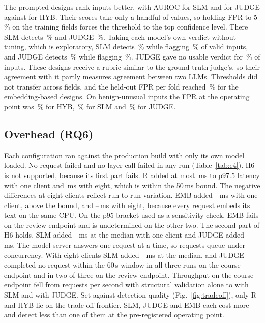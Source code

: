 \documentclass[conference]{IEEEtran}
\begin{document}
The prompted designs rank inputs better, with AUROC  for SLM and  for
JUDGE against  for HYB. Their scores take only a handful of values, so holding FPR to
5\,\% on the training fields forces the threshold to the top confidence level. There SLM detects
\,\% and JUDGE \,\%. Taking each model's own verdict without
tuning, which is exploratory, SLM detects \,\% while flagging \,\% of
valid inputs, and JUDGE detects \,\% while flagging \,\%. JUDGE
gave no usable verdict for \,\% of inputs. These designs receive a rubric similar
to the ground-truth judge's, so their agreement with it partly measures agreement between two LLMs.
Thresholds did not transfer across fields, and the held-out FPR per fold reached
\,\% for the embedding-based designs. On benign-unusual inputs the FPR at the
operating point was \,\% for HYB, \,\% for SLM and \,\%
for JUDGE.

\subsection{Overhead (RQ6)}

Each configuration ran against the production build with only its own model loaded. No request failed
and no layer call failed in any run (Table~\ref{tab:e4}). H6 is not supported, because its first part
fails. R added at most \,ms to p97.5 latency with one client and
\,ms with eight, which is within the 50\,ms bound. The negative differences at eight
clients reflect run-to-run variation. EMB added
--\,ms with one client, above the bound, and
--\,ms with eight, because every request embeds its text on the
same CPU. On the p95 bracket used as a sensitivity check, EMB fails on the review endpoint and is undetermined
on the other two. The second part of H6 holds. SLM added
--\,ms at the median with one client and JUDGE added
--\,ms. The model server answers one request at a
time, so requests queue under concurrency. With eight clients SLM added
--\,ms at the median, and JUDGE completed no request
within the 60\,s window in all three runs on the course endpoint and in two of three on the review
endpoint. Throughput on the course endpoint fell from  requests per
second with structural validation alone to  with SLM and
 with JUDGE. Set against detection quality (Fig.~\ref{fig:tradeoff}), only R
and HYB lie on the trade-off frontier. SLM, JUDGE and EMB each cost more and detect less than one of
them at the pre-registered operating point.
\end{document}
